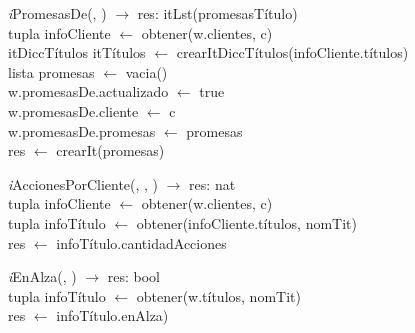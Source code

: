 \begin{Representacion}
\begin{Algoritmos}
\begin{algorithm}[H]
\textit{i}PromesasDe(, ) $\longrightarrow$ res: itLst(promesasTítulo)\\
\BlankLine
{}
\BlankLine
tupla infoCliente $\leftarrow$ obtener(w.clientes, c)\\
itDiccTítulos itTítulos $\leftarrow$ crearItDiccTítulos(infoCliente.títulos)\\
lista promesas $\leftarrow$ vacia()\\
\BlankLine
w.promesasDe.actualizado $\leftarrow$ true\\
w.promesasDe.cliente $\leftarrow$ c\\
w.promesasDe.promesas $\leftarrow$ promesas\\
\BlankLine
res $\leftarrow$ crearIt(promesas)\\
\end{algorithm}

\begin{algorithm}[H]
\textit{i}AccionesPorCliente(, , ) $\longrightarrow$ res: nat\\
\BlankLine
tupla infoCliente $\leftarrow$ obtener(w.clientes, c)\\
tupla infoTítulo $\leftarrow$ obtener(infoCliente.títulos, nomTit)\\
res $\leftarrow$ infoTítulo.cantidadAcciones\\
\end{algorithm}

\begin{algorithm}[H]
\textit{i}EnAlza(, ) $\longrightarrow$ res: bool\\
\BlankLine
tupla infoTítulo $\leftarrow$ obtener(w.títulos, nomTit)\\
res $\leftarrow$ infoTítulo.enAlza)\\
\end{algorithm}


\end{Algoritmos}
\end{Representacion}
